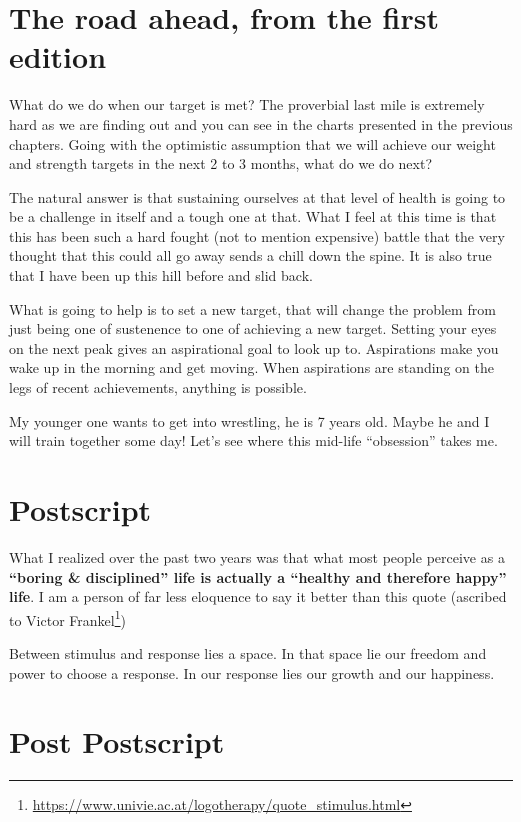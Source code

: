 \documentclass[
  oneside]{book}
\DeclareRobustCommand{\href}[2]{#2\footnote{\url{#1}}}
\begin{document}
\hypertarget{the-road-ahead-from-the-first-edition}{%
\section{The road ahead, from the first edition}\label{the-road-ahead-from-the-first-edition}}

What do we do when our target is met? The proverbial last mile is extremely hard as we are finding out and you can see in the charts presented in the previous chapters. Going with the optimistic assumption that we will achieve our weight and strength targets in the next 2 to 3 months, what do we do next?

The natural answer is that sustaining ourselves at that level of health is going to be a challenge in itself and a tough one at that. What I feel at this time is that this has been such a hard fought (not to mention expensive) battle that the very thought that this could all go away sends a chill down the spine. It is also true that I have been up this hill before and slid back.

What is going to help is to set a new target, that will change the problem from just being one of sustenence to one of achieving a new target. Setting your eyes on the next peak gives an aspirational goal to look up to. Aspirations make you wake up in the morning and get moving. When aspirations are standing on the legs of recent achievements, anything is possible.

My younger one wants to get into wrestling, he is 7 years old. Maybe he and I will train together some day! Let's see where this mid-life ``obsession'' takes me.

\hypertarget{postscript}{%
\section{Postscript}\label{postscript}}

What I realized over the past two years was that what most people perceive as a \textbf{``boring \& disciplined'' life is actually a ``healthy and therefore happy'' life}. I am a person of far less eloquence to say it better than this quote (\href{https://www.univie.ac.at/logotherapy/quote_stimulus.html}{ascribed to Victor Frankel})

Between stimulus and response lies a space. In that space lie our freedom and power to choose a response. In our response lies our growth and our happiness.

\hypertarget{post-postscript}{%
\section{Post Postscript}\label{post-postscript}}
\end{document}
